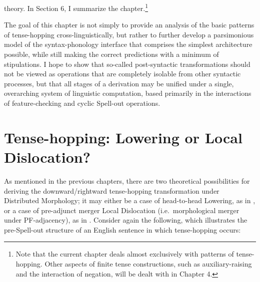 theory. In Section 6, I summarize the chapter.\footnote{Note that the current chapter deals almost exclusively with patterns of tense-hopping. Other aspects of finite tense constructions, such as auxiliary-raising and the interaction of negation, will be dealt with in Chapter 4.}

The goal of this chapter is not simply to provide an analysis of the basic patterns of tense-hopping cross-linguistically, but rather to further develop a parsimonious model of the syntax-phonology interface that comprises the simplest architecture possible, while still making the correct predictions with a minimum of stipulations. I hope to show that so-called post-syntactic transformations should not be viewed as operations that are completely isolable from other syntactic processes, but that all stages of a derivation may be unified under a single, overarching system of linguistic computation, based primarily in the interactions of feature-checking and cyclic Spell-out operations.

\clearpage
\section{Tense-hopping: Lowering or Local Dislocation?}
As mentioned in the previous chapters, there are two theoretical possibilities for deriving the downward/rightward tense-hopping transformation under Distributed Morphology; it may either be a case of head-to-head Lowering, as in \citet{embick_noyer2001}, or a case of pre-adjunct merger Local Dislocation (i.e.\ morphological merger under PF-adjacency), as in \citet{ochi1999}. Consider again the following, which illustrates the pre-Spell-out structure of an English sentence in which tense-hopping occurs:

